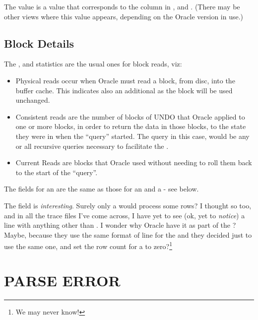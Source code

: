 The  value is a value that corresponds to the column  in ,  and . (There may be other views where this value appears, depending on the Oracle version in use.)

\subsection*{Block Details}\label{block-details}


The ,  and  statistics are the usual ones for block reads, viz:

\begin{itemize}
\tightlist
\item
  Physical reads occur when Oracle must read a block, from disc, into   the buffer cache. This indicates also an additional  as the block will be used unchanged.
\item
  Consistent reads are the number of blocks of UNDO that Oracle applied   to one or more blocks, in order to return the data in those blocks, to   the state they were in when the ``query'' started. The query in this   case, would be any or all recursive queries necessary to facilitate   the .
\item
  Current Reads are blocks that Oracle used without needing to roll them   back to the start of the ``query''.
\end{itemize}

The fields for an  are the same as those for an  and a  - see below.

The  field is \emph{interesting}. Surely only a  would process some rows? I thought so too, and in all the trace files I've come across, I have yet to see (ok, yet to \emph{notice}) a  line with anything other than . I wonder why Oracle have it as part of the ? Maybe, because they use the same format of line for the  and  they decided just to use the same one, and set the row count for a  to zero?\footnote{We may never know!}

\newpage\section{PARSE ERROR}\label{parse-error}

